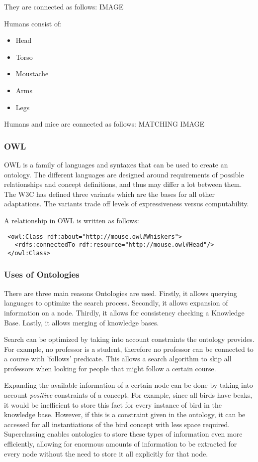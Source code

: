 \documentclass{article}
\begin{document}
 They are connected as follows: IMAGE
 
 Humans consist of:
 \begin{itemize}
 \item Head
 \item Torso
 \item Moustache
 \item Arms
 \item Legs
 \end{itemize} 
 
 Humans and mice are connected as follows: MATCHING IMAGE
 
 \subsubsection{OWL}
 OWL is a family of languages and syntaxes that can be used to create an ontology. The different languages are designed around requirements of possible relationships and concept definitions, and thus may differ a lot between them. The W3C has defined three variants which are the bases for all other adaptations. The variants trade off levels of expressiveness versus computability.

 A relationship in OWL is written as follows:
 
 \lstset{language=XML}
 \begin{lstlisting}
 <owl:Class rdf:about="http://mouse.owl#Whiskers">
   <rdfs:connectedTo rdf:resource="http://mouse.owl#Head"/>
 </owl:Class>
 \end{lstlisting}
 
 \subsubsection{Uses of Ontologies}
 There are three main reasons Ontologies are used. Firstly, it allows querying languages to optimize the search process. Secondly, it allows expansion of information on a node. Thirdly, it allows for consistency checking a Knowledge Base. Lastly, it allows merging of knowledge bases.
 
 Search can be optimized by taking into account constraints the ontology provides. For example, no professor is a student, therefore no professor can be connected to a course with 'follows' predicate. This allows a search algorithm to skip all professors when looking for people that might follow a certain course.
 
 Expanding the available information of a certain node can be done by taking into account \textit{positive} constraints of a concept. For example, since all birds have beaks, it would be inefficient to store this fact for every instance of bird in the knowledge base. However, if this is a constraint given in the ontology, it can be accessed for all instantiations of the bird concept with less space required. Superclassing enables ontologies to store these types of information even more efficiently, allowing for enormous amounts of information to be extracted for every node without the need to store it all explicitly for that node.
 
\end{document}
